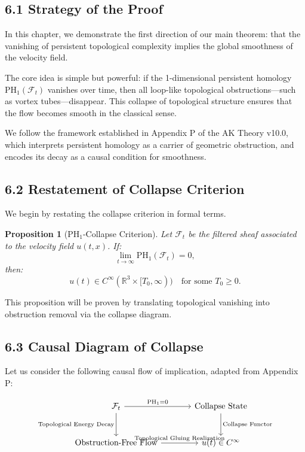 \documentclass[11pt]{article}
\newtheorem{proposition}[theorem]{Proposition}
\begin{document}
\subsection{6.1 Strategy of the Proof}

In this chapter, we demonstrate the first direction of our main theorem:  
that the vanishing of persistent topological complexity implies the global smoothness of the velocity field.

The core idea is simple but powerful:  
if the 1-dimensional persistent homology \( \mathrm{PH}_1(\mathcal{F}_t) \) vanishes over time,  
then all loop-like topological obstructions—such as vortex tubes—disappear.  
This collapse of topological structure ensures that the flow becomes smooth in the classical sense.

We follow the framework established in Appendix P of the AK Theory v10.0,  
which interprets persistent homology as a carrier of geometric obstruction,  
and encodes its decay as a causal condition for smoothness.

\subsection{6.2 Restatement of Collapse Criterion}

We begin by restating the collapse criterion in formal terms.

\begin{proposition}[PH$_1$-Collapse Criterion]
\label{prop:ph1collapse}
Let \( \mathcal{F}_t \) be the filtered sheaf associated to the velocity field \( u(t,x) \).  
If:
\[
\lim_{t \to \infty} \mathrm{PH}_1(\mathcal{F}_t) = 0,
\]
then:
\[
u(t) \in C^\infty(\mathbb{R}^3 \times [T_0, \infty))
\quad \text{for some } T_0 \ge 0.
\]
\end{proposition}

This proposition will be proven by translating topological vanishing into obstruction removal via the collapse diagram.

\subsection{6.3 Causal Diagram of Collapse}

Let us consider the following causal flow of implication, adapted from Appendix P:

\[
\begin{tikzcd}[row sep=large, column sep=large]
\mathcal{F}_t
  \arrow[r, "{\mathrm{PH}_1 = 0}"]
  \arrow[d, "{\text{Topological Energy Decay}}"']
& \text{Collapse State}
  \arrow[d, "{\text{Collapse Functor}}"] \\
\text{Obstruction-Free Flow}
  \arrow[r, "{\text{Topological Gluing Realization}}"]
& u(t) \in C^\infty
\end{tikzcd}
\]
\end{document}

